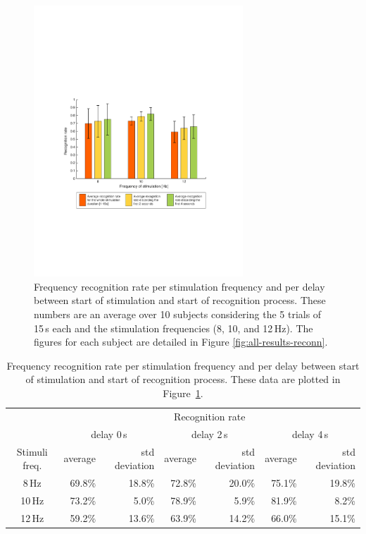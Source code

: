 \documentclass[smallextended]{svjour3}
\begin{document}
\begin{figure}
\center
\includegraphics[width=0.7\textwidth]{figures/taux-reconn.pdf}
\caption{Frequency recognition rate per stimulation frequency and per delay between start of stimulation and start of recognition process. These numbers are an average over 10 subjects considering the 5 trials of 15\,s each and the stimulation frequencies (8, 10, and 12\,Hz). The figures for each subject are detailed in Figure \ref{fig:all-results-reconn}.}
\label{fig:taux-reconn}
\end{figure}

\begin{table}\begin{center}
    \begin{tabular}{ c | r | r | r | r | r | r |}
        & \multicolumn{6}{c|}{Recognition rate} \\ 
        & \multicolumn{2}{c|}{delay 0\,s} & \multicolumn{2}{c|}{delay 2\,s} & \multicolumn{2}{c|}{delay 4\,s} \\ 
        Stimuli freq.& average & std deviation & average & std deviation & average & std deviation \\ \hline

         8\,Hz & 69.8\% & 18.8\% & 72.8\% & 20.0\% & 75.1\% & 19.8\% \\
        10\,Hz & 73.2\% &  5.0\% & 78.9\% & 5.9\% & 81.9\% & 8.2\% \\
        12\,Hz & 59.2\% & 13.6\% & 63.9\% & 14.2\% & 66.0\% & 15.1\% \\ \hline
    \end{tabular}
    \caption{Frequency recognition rate per stimulation frequency and per delay between start of stimulation and start of recognition process. These data are plotted in Figure~\ref{fig:taux-reconn}.}
\end{center}\end{table}
\end{document}
